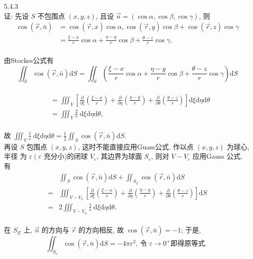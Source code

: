 \documentclass[a4paper,11pt,UTF8]{article}
\begin{document}
5.4.3\\
证: 先设 $S$ 不包围点 $(x, y, z)$, 且设 $\vec{n}=(\cos \alpha, \cos \beta, \cos \gamma)$, 则\\
$$
\begin{aligned}
	\cos (\vec{r}, \bar{n}) & =\cos (\vec{r}, x) \cos \alpha, \cos (\vec{r}, y) \cos \beta+\cos (\vec{r}, z) \cos \gamma \\
	& =\frac{\xi-x}{r} \cos \alpha+\frac{\eta-y}{r} \cos \beta+\frac{\theta-z}{r} \cos \gamma,
\end{aligned}
$$\\
由Stockes公式有
$$
\iint_S \cos (\vec{r}, \bar{n}) \mathrm{d} S=\iint_S\left(\frac{\xi-x}{r} \cos \alpha+\frac{\eta-y}{r} \cos \beta+\frac{\theta-z}{r} \cos \gamma\right) \mathrm{d} S
$$\\
$$
\begin{aligned}
	& =\iiint_V\left[\frac{\partial}{\partial \xi}\left(\frac{\xi-x}{r}\right)+\frac{\partial}{\partial \eta}\left(\frac{\eta-y}{r}\right)+\frac{\partial}{\partial \theta}\left(\frac{\theta-z}{r}\right)\right] \mathrm{d} \xi \mathrm{d} \eta \mathrm{d} \theta \\
	& =\iiint_V \frac{2}{r} \mathrm{~d} \xi \mathrm{d} \eta \mathrm{d} \theta,
\end{aligned}
$$\\
故 $\iiint_V \frac{1}{r} \mathrm{~d} \xi \mathrm{d} \eta \mathrm{d} \theta=\frac{1}{2} \iint_S \cos (\vec{r}, \bar{n}) \mathrm{d} S$.\\
再设 $S$ 包围点 $(x, y, z)$, 这时不能直接应用Guass公式. 作以点 $(x, y, z)$ 为球心, 半径 为 $\varepsilon\left(\varepsilon\right.$ 充分小)的闭球 $V_{\varepsilon}$, 其边界为球面 $S_{\varepsilon}$, 则对 $V-V_{\varepsilon}$ 应用Gauss 公式, 有\\
$$
\begin{aligned}
	& \iint_S \cos (\vec{r}, \bar{n}) \mathrm{d} S+\iint_{S_2} \cos (\vec{r}, \bar{n}) \mathrm{d} S \\
	= & \iiint_{V-V_x}\left[\frac{\partial}{\partial \xi}\left(\frac{\xi-x}{r}\right)+\frac{\partial}{\partial \eta}\left(\frac{\eta-y}{r}\right)+\frac{\partial}{\partial \theta}\left(\frac{\theta-z}{r}\right)\right] \mathrm{d} S \\
	= & 2 \iiint_{V-V_\alpha} \frac{1}{r} \mathrm{~d} \xi \mathrm{d} \eta \mathrm{d} \theta .
\end{aligned}
$$\\
在 $S_E$ 上, $\vec{n}$ 的方向与 $\vec{r}$ 的方向相反, 故 $\cos (\vec{r}, \bar{n})=-1$; 于是,
$$
\iint_{S_e} \cos (\vec{r}, \bar{n}) \mathrm{d} S=-4 \pi \varepsilon^2 \text {, 令 } \varepsilon \rightarrow 0^{+} \text {即得原等式. }
$$\\
\end{document}
